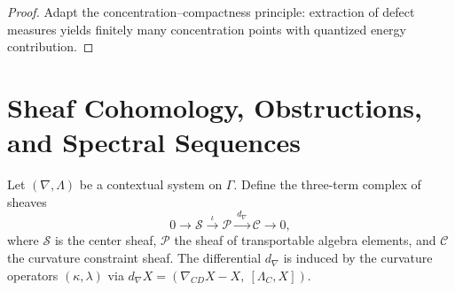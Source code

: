 \begin{proof}
Adapt the concentration–compactness principle: extraction of defect measures yields finitely many concentration points with quantized energy contribution. \relax
\end{proof}


\section{Sheaf Cohomology, Obstructions, and Spectral Sequences}
\label{sec:vol2-part4-cohomology}\relax\hspace{0pt}

\begin{definition}\label{def:sheaf-complex}
Let $(\nabla,\Lambda)$ be a contextual system on $\Gamma$.
Define the three-term complex of sheaves
\[
0\longrightarrow \mathcal S
\xrightarrow{\ \iota\ } \mathcal P
\xrightarrow{\ d_\nabla\ } \mathcal C
\longrightarrow 0,
\]
where $\mathcal S$ is the center sheaf, $\mathcal P$ the sheaf of transportable algebra elements, and $\mathcal C$ the curvature constraint sheaf. 
The differential $d_\nabla$ is induced by the curvature operators $(\kappa,\lambda)$ via $d_\nabla X=(\nabla_{CD}X - X,\ [\Lambda_C,X])$.
\end{definition}

